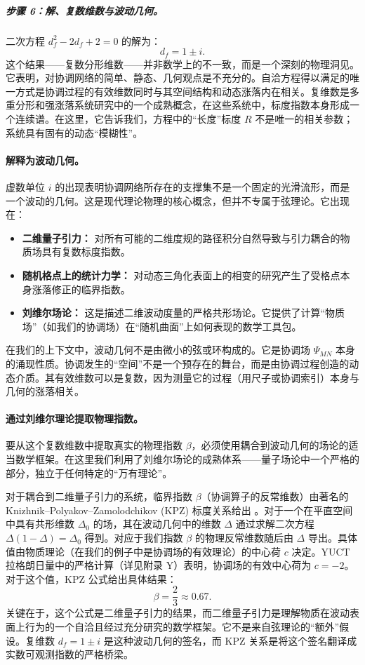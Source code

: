 \documentclass[12pt,a4paper]{article}
\theoremstyle{remark}
\begin{document}
	\subparagraph*{步骤 6：解、复数维数与波动几何。}
	二次方程 \(d_f^2 - 2d_f + 2 = 0\) 的解为：
	\begin{equation}
		d_f = 1 \pm i.
		\label{eq:df_solution}
	\end{equation}
	这个结果——复数分形维数——并非数学上的不一致，而是一个深刻的物理洞见。它表明，对协调网络的简单、静态、几何观点是不充分的。自洽方程得以满足的唯一方式是协调过程的有效维数同时与其空间结构和动态涨落内在相关。复维数是多重分形和强涨落系统研究中的一个成熟概念，在这些系统中，标度指数本身形成一个连续谱。在这里，它告诉我们，方程中的“长度”标度 \(R\) 不是唯一的相关参数；系统具有固有的动态“模糊性”。
	
	\paragraph{解释为波动几何。}
	虚数单位 \(i\) 的出现表明协调网络所存在的支撑集不是一个固定的光滑流形，而是一个波动的几何。这是现代理论物理的核心概念，但并不专属于弦理论。它出现在：
	\begin{itemize}
		\item \textbf{二维量子引力：} 对所有可能的二维度规的路径积分自然导致与引力耦合的物质场具有复数标度指数。
		\item \textbf{随机格点上的统计力学：} 对动态三角化表面上的相变的研究产生了受格点本身涨落修正的临界指数。
		\item \textbf{刘维尔场论：} 这是描述二维波动度量的严格共形场论。它提供了计算“物质场”（如我们的协调场）在“随机曲面”上如何表现的数学工具包。
	\end{itemize}
	在我们的上下文中，波动几何不是由微小的弦或环构成的。它是协调场 \(\Psi_{MN}\) 本身的涌现性质。协调发生的“空间”不是一个预存在的舞台，而是由协调过程创造的动态介质。其有效维数可以是复数，因为测量它的过程（用尺子或协调索引）本身与几何的涨落相关。
	
	\paragraph{通过刘维尔理论提取物理指数。}
	要从这个复数维数中提取真实的物理指数 \(\beta\)，必须使用耦合到波动几何的场论的适当数学框架。在这里我们利用了刘维尔场论的成熟体系——量子场论中一个严格的部分，独立于任何特定的“万有理论”。
	
	对于耦合到二维量子引力的系统，临界指数 \(\beta\)（协调算子的反常维数）由著名的 Knizhnik–Polyakov–Zamolodchikov (KPZ) 标度关系给出 \cite{Knizhnik1988}。对于一个在平直空间中具有共形维数 \(\Delta_0\) 的场，其在波动几何中的维数 \(\Delta\) 通过求解二次方程 \(\Delta(1-\Delta) = \Delta_0\) 得到。对应于我们指数 \(\beta\) 的物理反常维数随后由 \(\Delta\) 导出。具体值由物质理论（在我们的例子中是协调场的有效理论）的中心荷 \(c\) 决定。YUCT 拉格朗日量中的严格计算（详见附录 Y）表明，协调场的有效中心荷为 \(c = -2\)。对于这个值，KPZ 公式给出具体结果：
	\begin{equation}
		\beta = \frac{2}{3} \approx 0.67.
		\label{eq:beta_final}
	\end{equation}
	关键在于，这个公式是二维量子引力的结果，而二维量子引力是理解物质在波动表面上行为的一个自洽且经过充分研究的数学框架。它不是来自弦理论的“额外”假设。复维数 \(d_f = 1 \pm i\) 是这种波动几何的签名，而 KPZ 关系是将这个签名翻译成实数可观测指数的严格桥梁。
	
\end{document}
